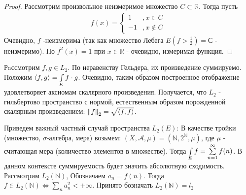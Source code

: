 \begin{proof}
	Рассмотрим произвольное неизмеримое множество $C \subset \mathbb{R}$. Тогда пусть
	\begin{gather*}
		f(x) = 
		\begin{cases}
			1  &, x \in C \\
			-1 &, x \notin C
		\end{cases}
	\end{gather*}
	Очевидно, $f$ -неизмерима (так как множество Лебега $E(f > \frac{1}{2}) = С$ - неизмеримо). Но $f^2(x) = 1$ при $x \in \mathbb{R}$ - очевидно, измеримая функция.
\end{proof}


Рaссмотрим $f, g \in L_2$. По неравенству Гельдера, их произведение суммируемо. Положим $\langle f , g\rangle = \int\limits_{E} f\cdot g$. 
Очевидно, таким образом построенное отображение удовлетворяет аксиомам скалярного произведения. 
Получается, что $L_2$ - гильбертово пространство с нормой, естественным образом порожденной скалярным произведением: $\left\|f\right\|_{2} = \sqrt{\langle f , f\rangle}$.\newline

Приведем важный частный случай пространства $L_2(E)$: В качестве тройки (множество, $\sigma$-алгебра, мера) возьмем: 
$\left(X, \mathscr{A}, \mu \right) = \left(\mathbb{N}, 2^{\mathbb{N}}, \mu\right)$, где $\mu$ - считающая мера (количество элементов в множестве).
Тогда $\int\limits_{E} f = \sum\limits_{n = 1}^{\infty} f(n)$. В данном контексте суммируемость будет значить абсолютную сходимость.
\newline 
Рассмотрим $L_2(\mathbb{N})$, Обозначаем $a_n = f(n)$. Тогда $f \in L_2 (\mathbb{N}) \Leftrightarrow \sum\limits_{n} a^2_n < +\infty$. Принято бозначать $L_2(\mathbb{N}) = l_2$
\newpage


